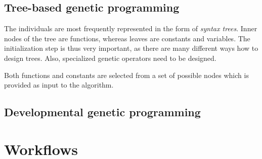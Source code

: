 \subsection{Tree-based genetic programming}
The individuals are most frequently represented in the form of 
\textit{syntax trees}. Inner nodes of the tree are functions, whereas leaves 
are constants and variables. The initialization step is thus very important, as
there are many different ways how to design trees. Also, specialized genetic
operators need to be designed.

Both functions and constants are selected from a set of possible nodes which 
is provided as input to the algorithm.



\subsection{Developmental genetic programming}

\section{Workflows}